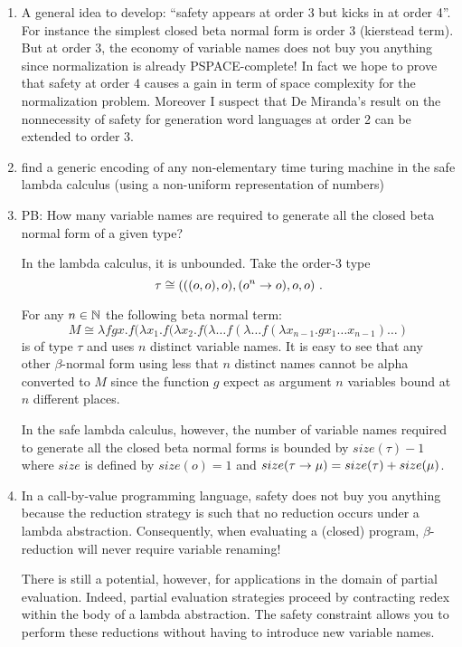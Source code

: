 \documentclass{article}
\begin{document}
\begin{enumerate}

\item A general idea to develop: ``safety appears at order 3 but kicks in at order 4''. For instance the simplest closed beta normal form is order 3 (kierstead term). But at order 3, the economy of variable names does not buy you anything since normalization is already PSPACE-complete! In fact we hope to prove that safety at order 4 causes a gain in term of space complexity for the normalization problem.
    Moreover I suspect that De Miranda's result on the nonnecessity of safety for generation word languages at order 2 can be extended to order 3.


\item find a generic encoding of any non-elementary time turing machine
in the safe lambda calculus (using a non-uniform representation of
numbers)


\item \label{safe_varnames} PB: How many variable names are required to generate all the
closed beta normal form of a given type?

In the lambda calculus, it is unbounded. Take the order-3 type
$$\tau
\cong (((o,o),o), (o^n\rightarrow o), o, o) \ . $$

For any $n\in\mathbb{N}$ the following beta normal term:
$$ M \cong \lambda f g x . f (\lambda x_1.f(\lambda x_2.f(\lambda \ldots f(\lambda \ldots f(\lambda x_{n-1}.g x_1 \ldots x_{n-1}) \ldots )$$
is of type $\tau$ and uses $n$ distinct variable names. It is easy to see that
any other $\beta$-normal form using less that $n$ distinct names cannot be alpha converted to $M$
since the function $g$ expect as argument $n$ variables bound at $n$ different places.


In the safe lambda calculus, however, the number of variable names
required to generate all the closed beta normal forms is bounded by
$size(\tau)-1$ where $size$ is defined by $size(o)= 1$ and
$size(\tau\rightarrow\mu) = size(\tau) + size(\mu)$.


\item In a call-by-value programming language, safety does not buy you anything because the reduction strategy is such that no reduction occurs under a lambda abstraction. Consequently, when evaluating a (closed) program, $\beta$-reduction will never require variable renaming!

    There is still a potential, however, for applications in the domain of partial evaluation. Indeed, partial evaluation strategies proceed by contracting redex within the body of a lambda abstraction. The safety constraint allows you to perform these reductions without having to introduce new variable names.
\end{enumerate}
\end{document}
